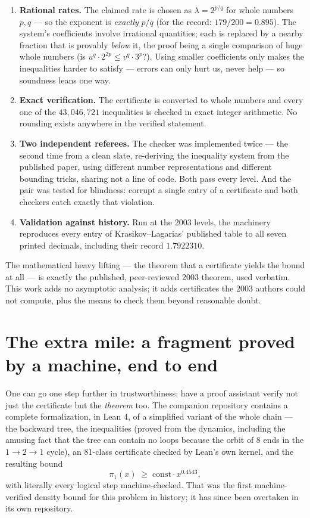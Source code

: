 \documentclass[11pt]{article}
\begin{document}
\begin{enumerate}
\item \textbf{Rational rates.} The claimed rate is chosen as
$\lambda = 2^{p/q}$ for whole numbers $p, q$ --- so the exponent is
\emph{exactly} $p/q$ (for the record: $179/200 = 0.895$). The system's
coefficients involve irrational quantities; each is replaced by a
nearby fraction that is provably \emph{below} it, the proof being a
single comparison of huge whole numbers (is $u^q \cdot 2^{2p} \le
v^q \cdot 3^p$?). Using smaller coefficients only makes the
inequalities harder to satisfy --- errors can only hurt us, never help
--- so soundness leans one way.
\item \textbf{Exact verification.} The certificate is converted to
whole numbers and every one of the $43{,}046{,}721$ inequalities is
checked in exact integer arithmetic. No rounding exists anywhere in the
verified statement.
\item \textbf{Two independent referees.} The checker was implemented
twice --- the second time from a clean slate, re-deriving the
inequality system from the published paper, using different number
representations and different bounding tricks, sharing not a line of
code. Both pass every level. And the pair was tested for blindness:
corrupt a single entry of a certificate and both checkers catch
exactly that violation.
\item \textbf{Validation against history.} Run at the 2003 levels, the
machinery reproduces every entry of Krasikov--Lagarias' published table
to all seven printed decimals, including their record $1.7922310$.
\end{enumerate}

The mathematical heavy lifting --- the theorem that a certificate
yields the bound at all --- is exactly the published, peer-reviewed
2003 theorem, used verbatim. This work adds no asymptotic analysis; it
adds certificates the 2003 authors could not compute, plus the means to
check them beyond reasonable doubt.

\section{The extra mile: a fragment proved by a machine, end to end}

One can go one step further in trustworthiness: have a proof assistant
verify not just the certificate but the \emph{theorem} too. The
companion repository contains a complete formalization, in Lean 4, of a
simplified variant of the whole chain --- the backward tree, the
inequalities (proved from the dynamics, including the amusing fact that
the tree can contain no loops because the orbit of 8 ends in the
$1 \to 2 \to 1$ cycle), an 81-class certificate checked by Lean's own
kernel, and the resulting bound
\[
\pi_1(x) \;\geq\; \text{const} \cdot x^{0.4543},
\]
with literally every logical step machine-checked. That was the first
machine-verified density bound for this problem in history; it has
since been overtaken in its own repository.
\end{document}
